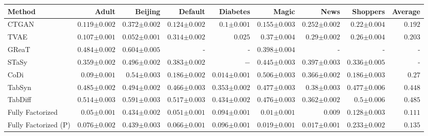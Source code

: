 \begin{tabular}{lrrrrrrr|r}
    \toprule[0.8pt]
     \textbf{Method} & \textbf{Adult} & \textbf{Beijing} & \textbf{Default} & \textbf{Diabetes} & \textbf{Magic} & \textbf{News} & \textbf{Shoppers} & \textbf{Average} \\
    \midrule 
    CTGAN & $0.119${\tiny${\pm 0.002}$} & $0.372${\tiny${\pm 0.002}$} & $0.124${\tiny${\pm 0.002}$} & $0.1${\tiny${\pm 0.001}$} & $0.155${\tiny${\pm 0.003}$} & $0.252${\tiny${\pm 0.002}$} & $0.22${\tiny${\pm 0.004}$} & $0.192$ \\
    TVAE & $0.107${\tiny${\pm 0.001}$} & $0.052${\tiny${\pm 0.001}$} & $0.314${\tiny${\pm 0.002}$} & $0.025$ & $0.37${\tiny${\pm 0.004}$} & $0.29${\tiny${\pm 0.002}$} & $0.26${\tiny${\pm 0.004}$} & $0.203$ \\
    GReaT & $0.484${\tiny${\pm 0.002}$} & $0.604${\tiny${\pm 0.005}$} & - & - & $0.398${\tiny${\pm 0.004}$} & - & - & - \\
    STaSy & $0.359${\tiny${\pm 0.002}$} & $0.496${\tiny${\pm 0.002}$} & $0.383${\tiny${\pm 0.002}$} & $-$ & $0.445${\tiny${\pm 0.003}$} & $0.397${\tiny${\pm 0.003}$} & $0.336${\tiny${\pm 0.005}$} & - \\
    CoDi & $0.09${\tiny${\pm 0.001}$} & $0.54${\tiny${\pm 0.003}$} & $0.186${\tiny${\pm 0.002}$} & $0.014${\tiny${\pm 0.001}$} & $0.506${\tiny${\pm 0.003}$} & $0.366${\tiny${\pm 0.002}$} & $0.186${\tiny${\pm 0.003}$} & $0.27$ \\
    TabSyn & $0.485${\tiny${\pm 0.002}$} & $0.494${\tiny${\pm 0.002}$} & $0.466${\tiny${\pm 0.003}$} & $0.353${\tiny${\pm 0.002}$} & $0.477${\tiny${\pm 0.003}$} & $0.38${\tiny${\pm 0.003}$} & $0.477${\tiny${\pm 0.006}$} & $0.448$ \\
    TabDiff & $0.514${\tiny${\pm 0.003}$} & $0.591${\tiny${\pm 0.003}$} & $0.517${\tiny${\pm 0.003}$} & $0.434${\tiny${\pm 0.002}$} & $0.476${\tiny${\pm 0.003}$} & $0.362${\tiny${\pm 0.002}$} & $0.5${\tiny${\pm 0.006}$} & $0.485$ \\
    \midrule
    Fully Factorized & $0.05${\tiny${\pm 0.001}$} & $0.434${\tiny${\pm 0.002}$} & $0.051${\tiny${\pm 0.001}$} & $0.094${\tiny${\pm 0.001}$} & $0.01${\tiny${\pm 0.001}$} & $0.009$ & $0.128${\tiny${\pm 0.003}$} & $0.111$ \\
    Fully Factorized (P) & $0.076${\tiny${\pm 0.002}$} & $0.439${\tiny${\pm 0.003}$} & $0.066${\tiny${\pm 0.001}$} & $0.096${\tiny${\pm 0.001}$} & $0.019${\tiny${\pm 0.001}$} & $0.017${\tiny${\pm 0.001}$} & $0.233${\tiny${\pm 0.002}$} & $0.135$ \\

\end{tabular}

